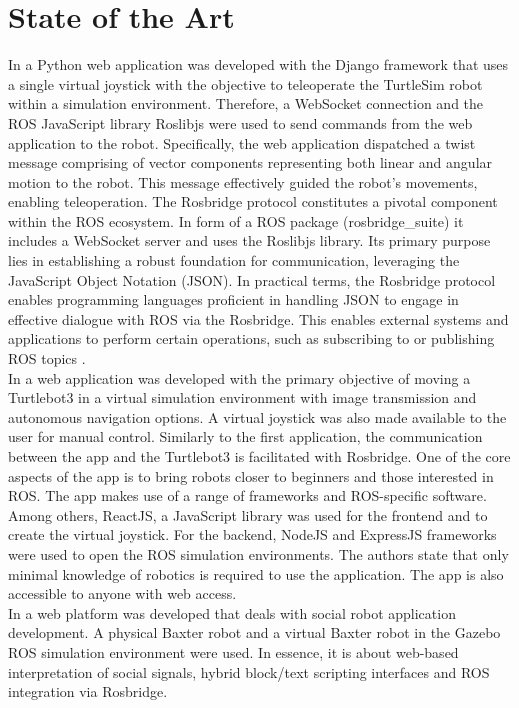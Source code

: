 \documentclass[conference]{IEEEtran}
\begin{document}
\section{State of the Art}
In \cite{kapic} a Python web application was developed with the Django framework that uses a single virtual joystick with the objective to teleoperate the TurtleSim robot within a simulation environment. 
Therefore, a WebSocket connection and the ROS JavaScript library Roslibjs were used to send commands from the web application to the robot. Specifically, the web application dispatched a twist message comprising of vector components representing both linear and angular motion to the robot. This message effectively guided the robot's movements, enabling teleoperation.
The Rosbridge protocol constitutes a pivotal component within the ROS ecosystem. In form of a ROS package (rosbridge\_suite) it includes a WebSocket server and uses the Roslibjs library. Its primary purpose lies in establishing a robust foundation for communication, leveraging the JavaScript Object Notation (JSON).
In practical terms, the Rosbridge protocol enables programming languages proficient in handling JSON to engage in effective dialogue with ROS via the Rosbridge. 
This enables external systems and applications to perform certain operations, such as subscribing to or publishing ROS topics \cite{rosbridgeOkState} \cite{rosbridgeSuite}.\\
In \cite{dinodi} a web application was developed with the primary objective of moving a Turtlebot3 in a virtual simulation environment with image transmission and autonomous navigation options. A virtual joystick was also made available to the user for manual control. Similarly to the first application, the communication between the app and the Turtlebot3 is facilitated with Rosbridge. 
One of the core aspects of the app is to bring robots closer to beginners and those interested in ROS. 
The app makes use of a range of frameworks and ROS-specific software. Among others, ReactJS, a JavaScript library was used for the frontend and to create the virtual joystick. For the backend, NodeJS and ExpressJS frameworks were used to open the ROS simulation environments. 
The authors state that only minimal knowledge of robotics is required to use the application. The app is also accessible to anyone with web access.\\
In \cite{johnson} a web platform was developed that deals with social robot application development. A physical Baxter robot and a virtual Baxter robot in the Gazebo ROS simulation environment were used. In essence, it is about web-based interpretation of social signals, hybrid block/text scripting interfaces and ROS integration via Rosbridge. 
\end{document}
